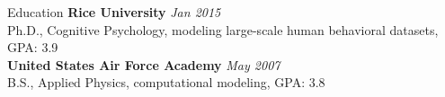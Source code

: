  
\begin{rSection}{Education}
  {\bf Rice University} \hfill {\em Jan 2015} \\
  Ph.D., Cognitive Psychology, modeling large-scale human behavioral datasets, GPA: 3.9 \\
  {\bf United States Air Force Academy} \hfill {\em May 2007} \\ 
  B.S., Applied Physics, computational modeling, GPA: 3.8 \\
\end{rSection}

